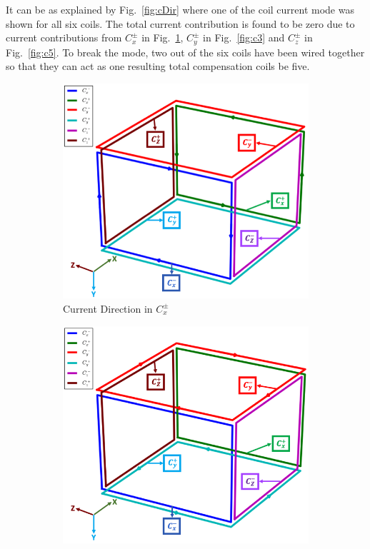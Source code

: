 
 It can be as explained by Fig.~\ref{fig:cDir} where one of the coil current mode was shown for all six coils. The total current contribution is found to be zero due to current contributions from $C_x^{\pm}$ in Fig.~\ref{fig:c1}, $C_y^{\pm}$ in Fig.~\ref{fig:c3} and $C_z^{\pm}$ in Fig.~\ref{fig:c5}. To break the mode, two out of the six coils have been wired together so that they can act as one resulting total compensation coils be five. 
\begin{figure}
    \begin{subfigure}{.5\linewidth}
        \centering
        \includegraphics[scale=.28]{Images/c1}
        \caption{Current Direction in $C_x^{\pm}$}
        \label{fig:c1}
    \end{subfigure}%
    \begin{subfigure}{.5\linewidth}
        \centering
        \includegraphics[scale=.28]{Images/c3}

\end{subfigure}
\end{figure}

